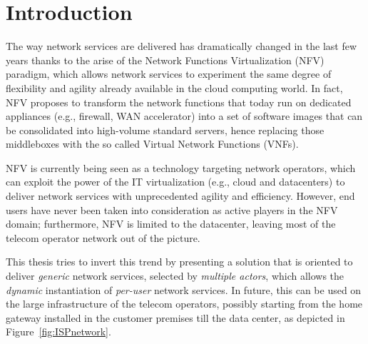 \chapter{Introduction}
\label{chap:Intro}
\label{sec:intro}

%

The way network services are delivered has dramatically changed in the last few years thanks to the arise of the Network Functions Virtualization (NFV) paradigm, which allows network services to experiment the same degree of flexibility and agility already available in the cloud computing world.
In fact, NFV proposes to transform the network functions that today run on dedicated appliances (e.g., firewall, WAN accelerator) into a set of software images that can be consolidated into high-volume standard servers, hence replacing those middleboxes with the so called Virtual Network Functions (VNFs).

NFV is currently being seen as a technology targeting network operators, which can exploit the power of the IT virtualization (e.g., cloud and datacenters) to deliver network services with unprecedented agility and efficiency.
However, end users have never been taken into consideration as active players in the NFV domain; furthermore, NFV is limited to the datacenter, leaving most of the telecom operator network out of the picture. 

This thesis tries to invert this trend by presenting a solution that is oriented to deliver \textit{generic} network services, selected by \textit{multiple actors}, which allows
the \textit{dynamic} instantiation of \textit{per-user} network services.
In future, this can be used on the large infrastructure of the telecom operators, possibly starting from the home gateway installed in the customer premises till the data center, as depicted in Figure~\ref{fig:ISPnetwork}.


